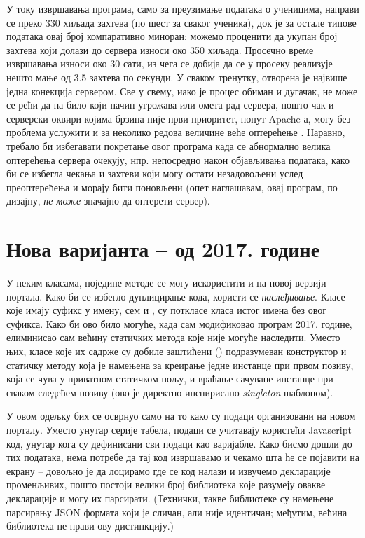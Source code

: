 У току извршавања програма, само за преузимање података о ученицима, направи се преко 330 хиљада захтева (по шест за сваког ученика), док је за остале типове података овај број компаративно миноран: можемо проценити да укупан број захтева који долази до сервера износи око 350 хиљада. Просечно време извршавања износи око 30 сати, из чега се добија да се у просеку реализује нешто мање од 3.5 захтева по секунди. У сваком тренутку, отворена је највише једна конекција сервером. Све у свему, иако је процес обиман и дугачак, не може се рећи да на било који начин угрожава или омета рад сервера, пошто чак и серверски оквири којима брзина није први приоритет, попут Apache-а, могу без проблема услужити и за неколико редова величине веће оптерећење \citep{apacheperf}. Наравно, требало би избегавати покретање овог програма када се абнормално велика оптерећења сервера очекују, нпр. непосредно након објављивања података, како би се избегла чекања и захтеви који могу остати незадовољени услед преоптерећења и морају бити поновљени (опет наглашавам, овај програм, по дизајну, \emph{не може} значајно да оптерети сервер).



\section{Нова варијанта -- од 2017. године}

У неким класама, поједине методе се могу искористити и на новој верзији портала. Како би се избегло дуплицирање кода, користи се \emph{наслеђивање}. Класе које имају суфикс  у имену, сем  и , су поткласе класа истог имена без овог суфикса. Како би ово било могуће, када сам модификовао програм 2017. године, елиминисао сам већину статичких метода које није могуће наследити. Уместо њих, класе које их садрже су добиле заштићени () подразумеван конструктор и статичку  методу која је намењена за креирање једне инстанце при првом позиву, која се чува у приватном статичком пољу, и враћање сачуване инстанце при сваком следећем позиву (ово је директно инспирисано \emph{singleton} шаблоном).

У овом одељку бих се осврнуо само на то како су подаци организовани на новом порталу. Уместо унутар серије табела, подаци се учитавају користећи Javascript код, унутар кога су дефинисани сви подаци као варијабле. Како бисмо дошли до тих података, нема потребе да тај код извршавамо и чекамо шта ће се појавити на екрану -- довољно је да лоцирамо где се код налази и извучемо декларације променљивих, пошто постоји велики број библиотека које разумеју овакве декларације и могу их парсирати. (Технички, такве библиотеке су намењене парсирању JSON формата који је сличан, али није идентичан; међутим, већина библиотека не прави ову дистинкцију.) 


